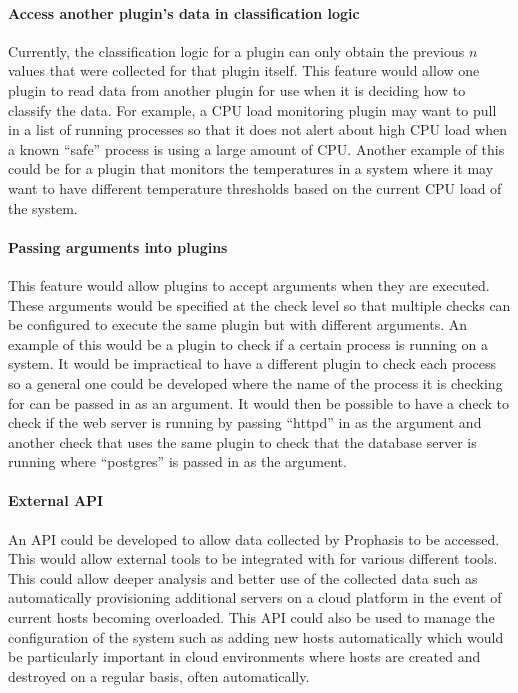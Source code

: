 \documentclass[bsc,logo,twoside,parskip,singlespacing,notimes]{infthesis}
\begin{document}
\paragraph*{Access another plugin's data in classification logic}
	Currently, the classification logic for a plugin can only obtain the previous
	$n$ values that were collected for that plugin itself.  This feature would
	allow one plugin to read data from another plugin for use when it is deciding
	how to classify the data.  For example, a CPU load monitoring plugin may want
	to pull in a list of running processes so that it does not alert about high CPU
	load when a known ``safe'' process is using a large amount of CPU. Another
	example of this could be for a plugin that monitors the temperatures in a
	system where it may want to have different temperature thresholds based on the
	current CPU load of the system.

\paragraph*{Passing arguments into plugins}
	This feature would allow plugins to accept arguments when they are executed.
	These arguments would be specified at the check level so that multiple checks
	can be configured to execute the same plugin but with different arguments. An
	example of this would be a plugin to check if a certain process is running on
	a system.  It would be impractical to have a different plugin to check each
	process so a general one could be developed where the name of the process it
	is checking for can be passed in as an argument.  It would then be possible to
	have a check to check if the web server is running by passing ``httpd'' in as the
	argument and another check that uses the same plugin to check that the database
	server is running where ``postgres'' is passed in as the argument.

\paragraph*{External API}
	An API could be developed to allow data collected by Prophasis to be accessed.
	This would allow external tools to be integrated with for various different
	tools.  This could allow deeper analysis and better use of the collected data
	such as automatically provisioning additional servers on a cloud platform in
	the event of current hosts becoming overloaded.  This API could also be used
	to manage the configuration of the system such as adding new hosts
	automatically which would be particularly important in cloud environments where
	hosts are created and destroyed on a regular basis, often automatically.
\end{document}
